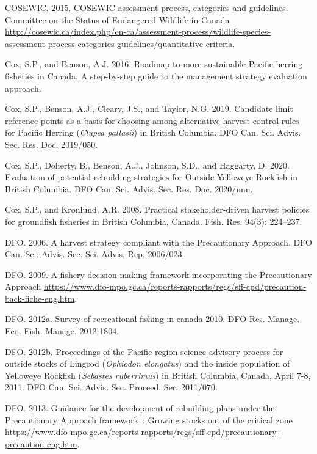 \documentclass[11pt]{book}
\begin{document}
\leavevmode\hypertarget{ref-cosewic2015}{}%
COSEWIC. 2015. COSEWIC assessment process, categories and guidelines. Committee on the Status of Endangered Wildlife in Canada \url{http://cosewic.ca/index.php/en-ca/assessment-process/wildlife-species-assessment-process-categories-guidelines/quantitative-criteria}.

\leavevmode\hypertarget{ref-cox2016}{}%
Cox, S.P., and Benson, A.J. 2016. Roadmap to more sustainable Pacific herring fisheries in Canada: A step-by-step guide to the management strategy evaluation approach.

\leavevmode\hypertarget{ref-cox2019}{}%
Cox, S.P., Benson, A.J., Cleary, J.S., and Taylor, N.G. 2019. Candidate limit reference points as a basis for choosing among alternative harvest control rules for Pacific Herring (\emph{Clupea pallasii}) in British Columbia. DFO Can. Sci. Advis. Sec. Res. Doc. 2019/050.

\leavevmode\hypertarget{ref-cox2020}{}%
Cox, S.P., Doherty, B., Benson, A.J., Johnson, S.D., and Haggarty, D. 2020. Evaluation of potential rebuilding strategies for Outside Yelloweye Rockfish in British Columbia. DFO Can. Sci. Advis. Sec. Res. Doc. 2020/nnn.

\leavevmode\hypertarget{ref-cox2008a}{}%
Cox, S.P., and Kronlund, A.R. 2008. Practical stakeholder-driven harvest policies for groundfish fisheries in British Columbia, Canada. Fish. Res. 94(3): 224--237.

\leavevmode\hypertarget{ref-dfo2006}{}%
DFO. 2006. A harvest strategy compliant with the Precautionary Approach. DFO Can. Sci. Advis. Sec. Sci. Advis. Rep. 2006/023.

\leavevmode\hypertarget{ref-dfo2009}{}%
DFO. 2009. A fishery decision-making framework incorporating the Precautionary Approach \url{https://www.dfo-mpo.gc.ca/reports-rapports/regs/sff-cpd/precaution-back-fiche-eng.htm}.

\leavevmode\hypertarget{ref-dfo2012}{}%
DFO. 2012a. Survey of recreational fishing in canada 2010. DFO Res. Manage. Eco. Fish. Manage. 2012-1804.

\leavevmode\hypertarget{ref-dfo2012b}{}%
DFO. 2012b. Proceedings of the Pacific region science advisory process for outside stocks of Lingcod (\emph{Ophiodon elongatus}) and the inside population of Yelloweye Rockfish (\emph{Sebastes ruberrimus}) in British Columbia, Canada, April 7-8, 2011. DFO Can. Sci. Advis. Sec. Proceed. Ser. 2011/070.

\leavevmode\hypertarget{ref-dfo2013}{}%
DFO. 2013. Guidance for the development of rebuilding plans under the Precautionary Approach framework~: Growing stocks out of the critical zone \url{https://www.dfo-mpo.gc.ca/reports-rapports/regs/sff-cpd/precautionary-precaution-eng.htm}.
\end{document}
